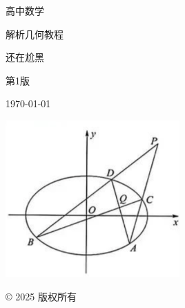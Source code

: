 \begin{titlepage}
    \centering
    \vspace*{0.5cm}
    
    {\fontsize{80}{80}\selectfont\songti 高中数学 \par}
    \vspace{0.1cm} %
    
    {\fontsize{65}{65}\selectfont\songti 解析几何教程 \par}
    \vspace{1cm} %
    
    {\Large {} 还在尬黑 \par}
    \vspace{0.1cm}
    
    {\Large {} 第1版 \par}
    \vspace{0.1cm}
    
    {\Large {} \today \par}
    \vspace{0.1cm}
    
    \includegraphics[width=0.5\textwidth]{flg/example.png} %
    \par\vspace{1cm}
    {\small \copyright{} 2025 版权所有}
\end{titlepage}